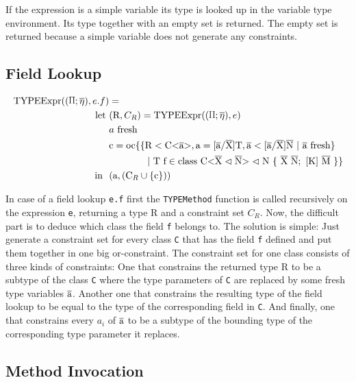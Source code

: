 If the expression is a simple variable its type is looked up in the variable type environment. Its type together with an empty set is returned. The empty set is returned because a simple variable does not generate any constraints.

\subsection{Field Lookup}

\begin{align*}
    \texpr{e.f} &= \\
    \text{let} \ &( \text{R}, C_R ) = \texpr{e} \\
    &\fresh{a} \\
    &\text{c} = \text{oc} \{ \{ \text{R} < \text{C<} \ot{a} \text{>}, \text{a} = \tsxsn{a}{X}{T}, \ot{a} < \tsxsns{a}{X}{N} \ | \ \fresh{\ot{a}} \} \\
    & \quad \quad \quad \quad | \ \text{T f} \in \class{X}{N} \}\\
    \text{in} \ \ & (\text{a}, (\text{C}_R \cup \{ \text{c} \} ))
\end{align*}

In case of a field lookup \verb|e.f| first the \verb|TYPEMethod| function is called recursively on the expression \verb|e|, returning a
type R and a constraint set $C_R$. Now, the difficult part is to deduce which class the field \verb|f| belongs to. The solution is simple:
Just generate a constraint set for every class \verb|C| that has the field \verb|f| defined and put them together in one big or-constraint.
The constraint set for one class consists of three kinds of constraints: One that constrains the returned type R to be a subtype
of the class \verb|C| where the type parameters of \verb|C| are replaced by some fresh type variables $\overline{\text{a}}$. Another one that constrains the resulting type of the field lookup
to be equal to the type of the corresponding field in \verb|C|. And finally, one that constrains every $a_i$ of $\overline{\text{a}}$ to be a subtype of the bounding type of the corresponding type parameter it replaces.

\subsection{Method Invocation}

